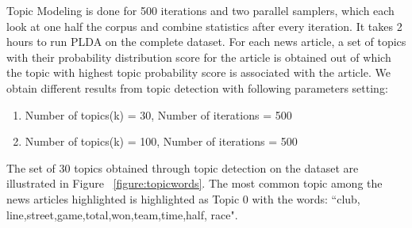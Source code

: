 Topic Modeling is done for 500 iterations and two parallel samplers, which each look at one half the corpus and combine
statistics after every iteration. It takes 2 hours to run PLDA on the complete dataset.
 For each news article, a set of topics with their probability distribution score for the article is obtained out of which the topic with highest topic probability score is associated with the article.  
We obtain different results from topic detection with following parameters setting:
\begin{enumerate}
 \item Number of topics(k) = 30, Number of iterations = 500
 \item Number of topics(k) = 100, Number of iterations = 500
\end{enumerate}
The set of 30 topics obtained through topic detection on the dataset are illustrated in Figure ~\ref{figure:topicwords}. The most common topic among the news articles highlighted is highlighted as Topic 0 with the words: ``club, line,street,game,total,won,team,time,half, race".


